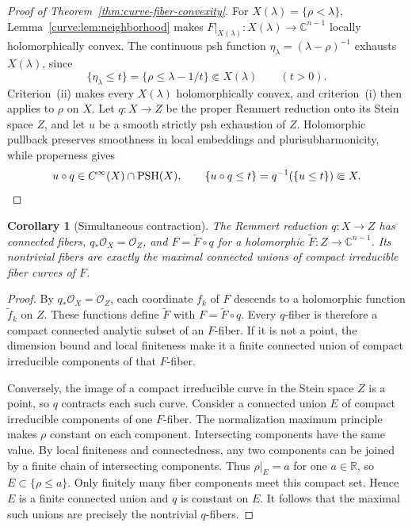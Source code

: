 \documentclass[11pt]{amsart}
\newtheorem{corollary}[theorem]{Corollary}
\theoremstyle{definition}
\theoremstyle{remark}
\numberwithin{equation}{section}
\newcommand{\C}{\mathbb C}
\newcommand{\R}{\mathbb R}
\newcommand{\OO}{\mathcal O}
\begin{document}
\begin{proof}[Proof of Theorem~\ref{thm:curve-fiber-convexity}]
For $X(\lambda)=\{\rho<\lambda\}$,
Lemma~\ref{curve:lem:neighborhood} makes
$F|_{X(\lambda)}:X(\lambda)\to\C^{n-1}$ locally holomorphically
convex. The continuous psh function
$\eta_\lambda=(\lambda-\rho)^{-1}$ exhausts $X(\lambda)$, since
\[
 \{\eta_\lambda\le t\}=\{\rho\le\lambda-1/t\}
 \Subset X(\lambda)\qquad(t>0).
\]
Criterion~\textup{(ii)} makes every $X(\lambda)$ holomorphically
convex, and criterion~\textup{(i)} then applies to $\rho$ on $X$.
Let $q:X\to Z$ be the proper Remmert reduction onto its Stein
space $Z$, and let $u$ be a smooth strictly psh exhaustion of $Z$.
Holomorphic pullback preserves smoothness in local embeddings and
plurisubharmonicity, while properness gives
\[
 u\circ q\in C^\infty(X)\cap\operatorname{PSH}(X),\qquad
 \{u\circ q\le t\}=q^{-1}(\{u\le t\})\Subset X.\qedhere
\]
\end{proof}

\begin{corollary}[Simultaneous contraction]\label{cor:curve-contraction}
The Remmert reduction $q:X\to Z$ has connected fibers,
$q_*\OO_X=\OO_Z$, and $F=\widetilde F\circ q$ for a holomorphic
$\widetilde F:Z\to\C^{n-1}$. Its nontrivial fibers are exactly the
maximal connected unions of compact irreducible fiber curves of $F$.
\end{corollary}
\begin{proof}
By $q_*\OO_X=\OO_Z$, each coordinate $f_k$ of $F$ descends to a
holomorphic function $\widetilde f_k$ on $Z$. These functions define
$\widetilde F$ with $F=\widetilde F\circ q$.
Every $q$-fiber is therefore a compact connected analytic subset of
an $F$-fiber. If it is not a point, the dimension bound and local
finiteness make it a finite connected union of compact irreducible
components of that $F$-fiber.

Conversely, the image of a compact irreducible curve in the Stein
space $Z$ is a point, so $q$ contracts each such curve. Consider a connected union $E$ of
compact irreducible components of one $F$-fiber. The normalization
maximum principle makes $\rho$ constant on each component.
Intersecting components have the same value. By local finiteness and
connectedness, any two components can be joined by a finite chain of
intersecting components.
Thus $\rho|_E=a$ for one $a\in\R$, so $E\subset\{\rho\le a\}$.
Only finitely many fiber components meet this compact set. Hence
$E$ is a finite connected union and $q$ is constant on $E$.
It follows that the maximal such unions are precisely the nontrivial
$q$-fibers.
\end{proof}
\end{document}
